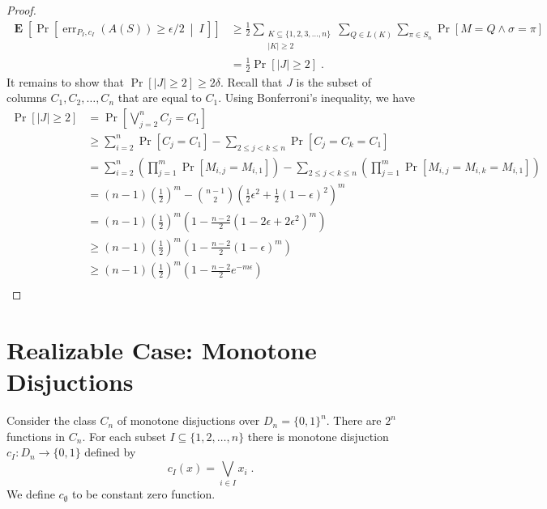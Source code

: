 \documentclass[10pt]{article}
\DeclareMathOperator{\err}{err}
\DeclareMathOperator{\Exp}{\mathbf{E}}
\begin{document}
\begin{proof}
\begin{align*}
\Exp \left[ \Pr \left[\err_{P_I,c_I}(A(S)) \ge \epsilon/2 \ \middle| \ I \, \right] \right]
& \ge \frac{1}{2} \sum_{\substack{K \subseteq \{1,2,3,\dots,n\} \\ |K| \ge 2}} \sum_{Q \in L(K)} \sum_{\pi \in S_n} \Pr \left[ M = Q \wedge \sigma = \pi \right] \\
& = \frac{1}{2} \Pr \left[ |J| \ge 2 \right] \; .
\end{align*}
It remains to show that $\Pr \left[ |J| \ge 2 \right] \ge 2 \delta$.
Recall that $J$ is the subset of columns $C_1, C_2, \dots, C_n$ that are equal to $C_1$.
Using Bonferroni's inequality, we have
\begin{align*}
\Pr\left[ |J| \ge 2 \right]
& = \Pr\left[ \bigvee_{j=2}^n C_j = C_1 \right] \\
& \ge \sum_{i=2}^n \Pr\left[ C_j = C_1 \right] - \sum_{2 \le  j < k \le n} \Pr\left[ C_j = C_k = C_1 \right] \\
& = \sum_{i=2}^n \left( \prod_{j=1}^m \Pr\left[ M_{i,j} = M_{i,1} \right] \right) - \sum_{2 \le j < k \le n} \left( \prod_{j=1}^m \Pr\left[ M_{i,j} = M_{i,k} = M_{i,1} \right] \right) \\
& = (n-1) \left( \frac{1}{2} \right)^m - \binom{n-1}{2} \left( \frac{1}{2} \epsilon^2 + \frac{1}{2} (1-\epsilon)^2 \right)^m \\
& = (n-1) \left( \frac{1}{2} \right)^m \left(1 - \frac{n-2}{2}(1 - 2\epsilon + 2\epsilon^2)^m \right) \\
& \ge (n-1) \left( \frac{1}{2} \right)^m \left(1 - \frac{n-2}{2}(1 - \epsilon)^m \right) \\
& \ge (n-1) \left( \frac{1}{2} \right)^m \left(1 - \frac{n-2}{2} e^{-m\epsilon} \right) \\
\end{align*}
\end{proof}

\section{Realizable Case: Monotone Disjuctions}

Consider the class $C_n$ of monotone disjuctions over $D_n = \{0,1\}^n$.
There are $2^n$ functions in $C_n$. For each subset $I \subseteq \{1,2,\dots,n\}$
there is monotone disjuction $c_I:D_n \to \{0,1\}$ defined by
$$
c_I(x) = \bigvee_{i \in I} x_i \; .
$$
We define $c_\emptyset$ to be constant zero function.
\end{document}
